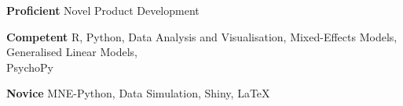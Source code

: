 \textbf{Proficient} \phantom{:} Novel Product Development

\textbf{Competent} R, Python, Data Analysis and Visualisation, Mixed-Effects Models, Generalised Linear Models, \\
 PsychoPy

\textbf{Novice}  MNE-Python, Data Simulation, Shiny, LaTeX
